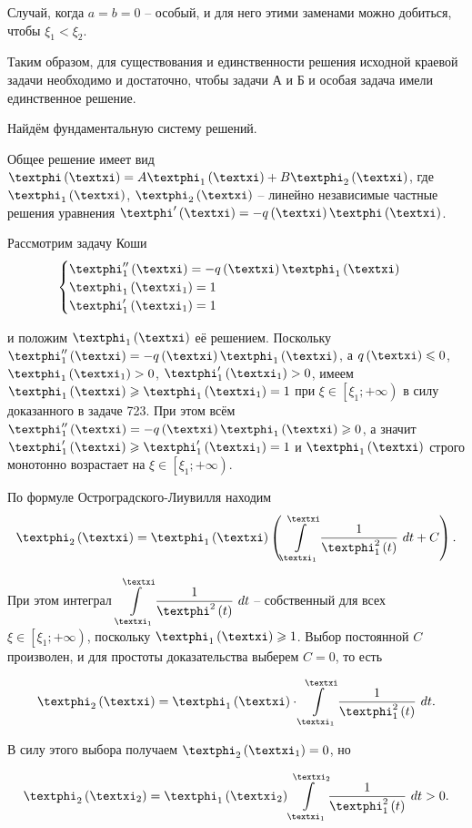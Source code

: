 \documentclass[a5paper,10pt]{article}
\begin{document}
Случай, когда $a = b = 0$ -- особый, и для него этими заменами можно добиться, чтобы $\xi_{1} < \xi_{2}$.

Таким образом, для существования и единственности решения исходной краевой задачи необходимо и достаточно, чтобы задачи А и Б и особая задача имели единственное решение.

\begin{step} { Найдём фундаментальную систему решений. } \end{step}

Общее решение имеет вид $\phi\br{\xi} = A \phi_{1}\br{\xi} + B \phi_{2}\br{\xi}$, где $\phi_{1}\br{\xi}$, $\phi_{2}\br{\xi}$ -- линейно независимые частные решения уравнения $\phi'\br{\xi} = -q\br{\xi}\phi\br{\xi}$.

Рассмотрим задачу Коши
$$\begin{cases}
    \phi_{1}''\br{\xi} = -q\br{\xi}\phi_{1}\br{\xi} \\
    \phi_{1}\br{\xi_{1}} = 1 \\
    \phi_{1}'\br{\xi_{1}} = 1
\end{cases}$$

и положим $\phi_{1}\br{\xi}$ её решением. Поскольку $\phi_{1}''\br{\xi} = -q\br{\xi}\phi_{1}\br{\xi}$, а $q\br{\xi} \le 0$, \linebreak $\phi_{1}\br{\xi_{1}} > 0$, $\phi'_{1}\br{\xi_{1}} > 0$, имеем $\phi_{1}\br{\xi} \ge \phi_{1}\br{\xi_{1}} = 1$ при $\xi \in \left[ \xi_{1}; +\infty \right)$ в силу доказанного в задаче 723. При этом всём $\phi_{1}''\br{\xi} = -q\br{\xi}\phi_{1}\br{\xi} \ge 0$, а значит $\phi'_{1}\br{\xi} \ge \phi'_{1}\br{\xi_{1}} = 1$ и $\phi_{1}\br{\xi}$ строго монотонно возрастает на $\xi \in \left[ \xi_{1}; +\infty \right)$.

По формуле Остроградского-Лиувилля находим
$$\phi_{2}\br{\xi} = \phi_{1}\br{\xi} \br{\tintlim{\xi_{1}}{\xi} { \frac{1} {\phi^2_{1}\br{t}} \ dt} + C}.$$

При этом интеграл $\tintlim{\xi_{1}}{\xi} { \dfrac {1}{\phi^{2}\br{t}} \ dt}$ -- собственный для всех $\xi \in \left[ \xi_{1}; +\infty \right)$, поскольку $\phi_{1}\br{\xi} \ge 1$. Выбор постоянной $C$ произволен, и для простоты доказательства выберем $C = 0$, то есть

$$\phi_{2}\br{\xi} = \phi_{1}\br{\xi} \cdot \tintlim{\xi_{1}}{\xi} { \frac{1} {\phi^2_{1}\br{t}} \ dt}.$$

В силу этого выбора получаем $\phi_{2}\br{\xi_{1}} = 0$, но 

$$\phi_{2}\br{\xi_{2}} = \phi_{1}\br{\xi_{2}} \tintlim{\xi_{1}}{\xi_{2}} { \frac{1} {\phi^2_{1}\br{t}} \ dt} > 0 .$$
\end{document}
